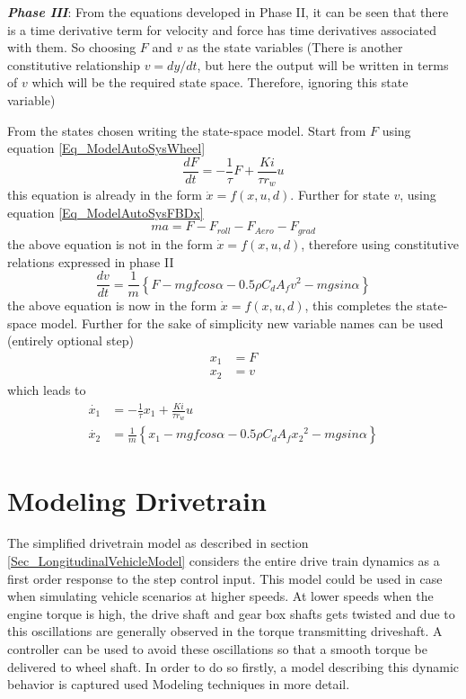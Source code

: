 \textbf{\textit{Phase III}}: From the equations developed in Phase II, it can be seen that there is a time derivative term for velocity and force has time derivatives associated with them. So choosing $F$ and $v$ as the state variables (There is another constitutive relationship $v = dy/dt$, but here the output will be written in terms of $v$ which will be the required state space. Therefore, ignoring this state variable)

From the states chosen writing the state-space model. Start from $F$ using equation \eqref{Eq_ModelAutoSysWheel}
\begin{equation}
	\frac{dF}{dt} = -\frac{1}{\tau} F + \frac{K i}{\tau r_w} u
\end{equation}
this equation is already in the form $\dot{x} = f(x,u,d)$. Further for state $v$, using equation \eqref{Eq_ModelAutoSysFBDx}
\begin{equation}
	m a = F - F_{roll} - F_{Aero} - F_{grad}
\end{equation}
the above equation is not in the form $\dot{x} = f(x,u,d)$, therefore using constitutive relations expressed in phase II
\begin{equation}
	\frac{dv}{dt} = \frac{1}{m} \left\{F - m g f cos\alpha -0.5 \rho C_{d} A_{f} v^2 - m g sin\alpha \right\}
\end{equation}
the above equation is now in the form $\dot{x} = f(x,u,d)$, this completes the state-space model. Further for the sake of simplicity new variable names can be used (entirely optional step)
\begin{align}
	x_1 &= F \\
	x_2 &= v
\end{align}
which leads to
\begin{align}
	\dot{x_1} &= -\frac{1}{\tau} x_1 + \frac{K i}{\tau r_w} u \\
	\dot{x_2} &= \frac{1}{m} \left\{x_1 - m g f cos\alpha -0.5 \rho C_{d} A_{f} {x_2}^2 - m g sin\alpha \right\}
\end{align}

\section{Modeling Drivetrain}

The simplified drivetrain model as described in section \ref{Sec_LongitudinalVehicleModel} considers the entire drive train dynamics as a first order response to the step control input. This model could be used in case when simulating vehicle scenarios at higher speeds. At lower speeds when the engine torque is high, the drive shaft and gear box shafts gets twisted and due to this oscillations are generally observed in the torque transmitting driveshaft. A controller can be used to avoid these oscillations so that a smooth torque be delivered to wheel shaft. In order to do so firstly, a model describing this dynamic behavior is captured used Modeling techniques in more detail.

